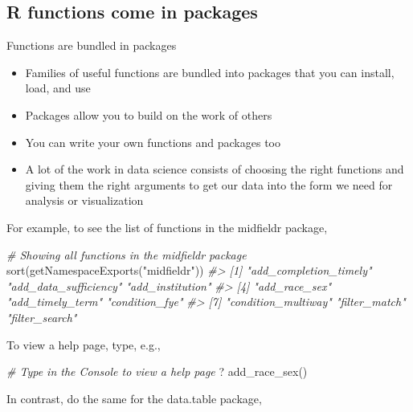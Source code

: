 \documentclass[
]{book}
\newenvironment{Shaded}{\begin{snugshade}}{\end{snugshade}}
\newcommand{\CommentTok}[1]{\textcolor[rgb]{0.56,0.35,0.01}{\textit{#1}}}
\newcommand{\FunctionTok}[1]{\textcolor[rgb]{0.00,0.00,0.00}{#1}}
\newcommand{\NormalTok}[1]{#1}
\newcommand{\StringTok}[1]{\textcolor[rgb]{0.31,0.60,0.02}{#1}}
\providecommand{\tightlist}{%
  \setlength{\itemsep}{0pt}\setlength{\parskip}{0pt}}
\begin{document}
\hypertarget{r-functions-come-in-packages}{%
\subsection{R functions come in packages}\label{r-functions-come-in-packages}}

Functions are bundled in packages

\begin{itemize}
\tightlist
\item
  Families of useful functions are bundled into packages that you can install, load, and use
\item
  Packages allow you to build on the work of others
\item
  You can write your own functions and packages too
\item
  A lot of the work in data science consists of choosing the right functions and giving them the right arguments to get our data into the form we need for analysis or visualization
\end{itemize}

For example, to see the list of functions in the midfieldr package,

\begin{Shaded}
\begin{Highlighting}[]
\CommentTok{\# Showing all functions in the midfieldr package }
\FunctionTok{sort}\NormalTok{(}\FunctionTok{getNamespaceExports}\NormalTok{(}\StringTok{"midfieldr"}\NormalTok{))}
\CommentTok{\#\textgreater{} [1] "add\_completion\_timely" "add\_data\_sufficiency"  "add\_institution"      }
\CommentTok{\#\textgreater{} [4] "add\_race\_sex"          "add\_timely\_term"       "condition\_fye"        }
\CommentTok{\#\textgreater{} [7] "condition\_multiway"    "filter\_match"          "filter\_search"}
\end{Highlighting}
\end{Shaded}

To view a help page, type, e.g.,

\begin{Shaded}
\begin{Highlighting}[]
\CommentTok{\# Type in the Console to view a help page }
\NormalTok{? }\FunctionTok{add\_race\_sex}\NormalTok{() }
\end{Highlighting}
\end{Shaded}

In contrast, do the same for the data.table package,
\end{document}
